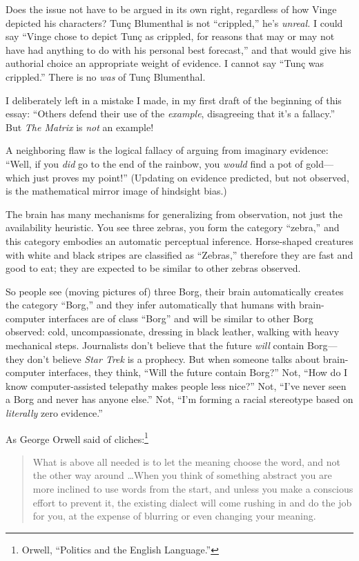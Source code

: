 {
 Does the issue not have to be argued in its own right, regardless
of how Vinge depicted his characters? Tunç Blumenthal is not
``crippled,'' he's
\textit{unreal.} I could say ``Vinge chose to depict
Tunç as crippled, for reasons that may or may not have had anything to
do with his personal best forecast,'' and that would
give his authorial choice an appropriate weight of evidence. I cannot
say ``Tunç was crippled.'' There is
no \textit{was} of Tunç Blumenthal.}

{
 I deliberately left in a mistake I made, in my first draft of the
beginning of this essay: ``Others defend their use of
the \textit{example}, disagreeing that it's a
fallacy.'' But \textit{The Matrix} is \textit{not} an
example!}

{
 A neighboring flaw is the logical fallacy of arguing from
imaginary evidence: ``Well, if you \textit{did} go to
the end of the rainbow, you \textit{would} find a pot of gold---which
just proves my point!'' (Updating on evidence
predicted, but not observed, is the mathematical mirror image of
hindsight bias.)}

{
 The brain has many mechanisms for generalizing from observation,
not just the availability heuristic. You see three zebras, you form the
category ``zebra,'' and this
category embodies an automatic perceptual inference. Horse-shaped
creatures with white and black stripes are classified as
``Zebras,'' therefore they are fast
and good to eat; they are expected to be similar to other zebras
observed.}

{
 So people see (moving pictures of) three Borg, their brain
automatically creates the category
``Borg,'' and they infer
automatically that humans with brain-computer interfaces are of class
``Borg'' and will be similar to
other Borg observed: cold, uncompassionate, dressing in black leather,
walking with heavy mechanical steps. Journalists don't
believe that the future \textit{will} contain Borg---they
don't believe \textit{Star Trek} is a prophecy. But
when someone talks about brain-computer interfaces, they think,
``Will the future contain Borg?''
Not, ``How do I know computer-assisted telepathy makes
people less nice?'' Not,
``I've never seen a Borg and never has
anyone else.'' Not,
``I'm forming a racial stereotype
based on \textit{literally} zero evidence.''}

{
 As George Orwell said of cliches:\footnote{Orwell, ``Politics and the English
Language.''}}

\begin{quote}
{
 What is above all needed is to let the meaning choose the word,
and not the other way around \ldots When you think of something abstract
you are more inclined to use words from the start, and unless you make
a conscious effort to prevent it, the existing dialect will come
rushing in and do the job for you, at the expense of blurring or even
changing your meaning.}
\end{quote}

